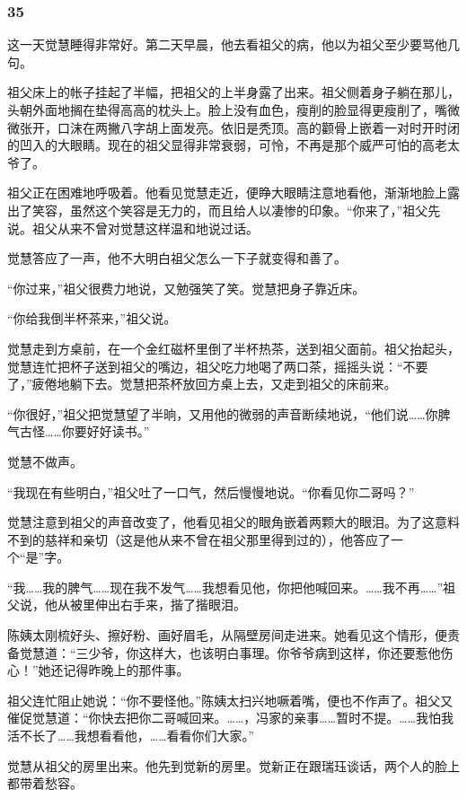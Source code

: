 \subsubsection*{35}


\par 这一天觉慧睡得非常好。第二天早晨，他去看祖父的病，他以为祖父至少要骂他几句。
\par 祖父床上的帐子挂起了半幅，把祖父的上半身露了出来。祖父侧着身子躺在那儿，头朝外面地搁在垫得高高的枕头上。脸上没有血色，瘦削的脸显得更瘦削了，嘴微微张开，口沫在两撇八字胡上面发亮。依旧是秃顶。高的颧骨上嵌着一对时开时闭的凹入的大眼睛。现在的祖父显得非常衰弱，可怜，不再是那个威严可怕的高老太爷了。
\par 祖父正在困难地呼吸着。他看见觉慧走近，便睁大眼睛注意地看他，渐渐地脸上露出了笑容，虽然这个笑容是无力的，而且给人以凄惨的印象。“你来了，”祖父先说。祖父从来不曾对觉慧这样温和地说过话。
\par 觉慧答应了一声，他不大明白祖父怎么一下子就变得和善了。
\par “你过来，”祖父很费力地说，又勉强笑了笑。觉慧把身子靠近床。
\par “你给我倒半杯茶来，”祖父说。
\par 觉慧走到方桌前，在一个金红磁杯里倒了半杯热茶，送到祖父面前。祖父抬起头，觉慧连忙把杯子送到祖父的嘴边，祖父吃力地喝了两口茶，摇摇头说：“不要了，”疲倦地躺下去。觉慧把茶杯放回方桌上去，又走到祖父的床前来。
\par “你很好，”祖父把觉慧望了半晌，又用他的微弱的声音断续地说，“他们说……你脾气古怪……你要好好读书。”
\par 觉慧不做声。
\par “我现在有些明白，”祖父吐了一口气，然后慢慢地说。“你看见你二哥吗？”
\par 觉慧注意到祖父的声音改变了，他看见祖父的眼角嵌着两颗大的眼泪。为了这意料不到的慈祥和亲切（这是他从来不曾在祖父那里得到过的），他答应了一个“是”字。
\par “我……我的脾气……现在我不发气……我想看见他，你把他喊回来。……我不再……”祖父说，他从被里伸出右手来，揩了揩眼泪。
\par 陈姨太刚梳好头、擦好粉、画好眉毛，从隔壁房间走进来。她看见这个情形，便责备觉慧道：“三少爷，你这样大，也该明白事理。你爷爷病到这样，你还要惹他伤心！”她还记得昨晚上的那件事。
\par 祖父连忙阻止她说：“你不要怪他。”陈姨太扫兴地噘着嘴，便也不作声了。祖父又催促觉慧道：“你快去把你二哥喊回来。……，冯家的亲事……暂时不提。……我怕我活不长了……我想看看他，……看看你们大家。”
\par 觉慧从祖父的房里出来。他先到觉新的房里。觉新正在跟瑞珏谈话，两个人的脸上都带着愁容。
